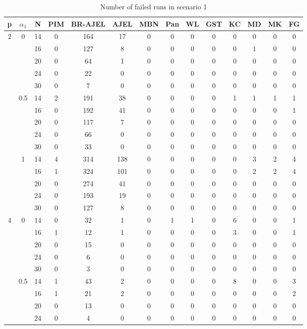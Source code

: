 \documentclass[num-refs]{wiley-article}
\begin{document}
\begin{table}[htbp!]
\scriptsize
\caption{Number of failed runs in scenario 1}
\centering
\begin{tabular}[t]{cccccccccccccc}
\hline
p & $\alpha_1$ & N & PIM & BR-AJEL & AJEL & MBN & Pan & WL & GST & KC & MD & MK & FG\\
\hline
2 & 0 & 14 & 0 & 164 & 17 & 0 & 0 & 0 & 0 & 0 & 0 & 0 & 0\\
& & 16 & 0 & 127 & 8 & 0 & 0 & 0 & 0 & 0 & 1 & 0 & 0\\
& & 20 & 0 & 64 & 1 & 0 & 0 & 0 & 0 & 0 & 0 & 0 & 0\\
& & 24 & 0 & 22 & 0 & 0 & 0 & 0 & 0 & 0 & 0 & 0 & 0\\
& & 30 & 0 & 7 & 0 & 0 & 0 & 0 & 0 & 0 & 0 & 0 & 0\\
\hline
 & 0.5 & 14 & 2 & 191 & 38 & 0 & 0 & 0 & 0 & 1 & 1 & 1 & 1\\
& & 16 & 0 & 192 & 41 & 0 & 0 & 0 & 0 & 0 & 0 & 0 & 1\\
& & 20 & 0 & 117 & 7 & 0 & 0 & 0 & 0 & 0 & 0 & 0 & 0\\
& & 24 & 0 & 66 & 0 & 0 & 0 & 0 & 0 & 0 & 0 & 0 & 0\\
&& 30 & 0 & 33 & 0 & 0 & 0 & 0 & 0 & 0 & 0 & 0 & 0\\
\hline
 & 1 & 14 & 4 & 314 & 138 & 0 & 0 & 0 & 0 & 0 & 3 & 2 & 4\\
& & 16 & 1 & 324 & 101 & 0 & 0 & 0 & 0 & 0 & 2 & 2 & 4\\
& & 20 & 0 & 274 & 41 & 0 & 0 & 0 & 0 & 0 & 0 & 0 & 0\\
& & 24 & 0 & 193 & 19 & 0 & 0 & 0 & 0 & 0 & 0 & 0 & 0\\
& & 30 & 0 & 127 & 8 & 0 & 0 & 0 & 0 & 0 & 0 & 0 & 0\\
\hline
4 & 0& 14 & 0 & 32 & 1 & 0 & 1 & 1 & 0 & 6 & 0 & 0 & 1\\
& & 16 & 1 & 12 & 1 & 0 & 0 & 0 & 0 & 3 & 0 & 0 & 1\\
& & 20 & 0 & 15 & 0 & 0 & 0 & 0 & 0 & 0 & 0 & 0 & 0\\
& & 24 & 0 & 6 & 0 & 0 & 0 & 0 & 0 & 0 & 0 & 0 & 0\\
& & 30 & 0 & 3 & 0 & 0 & 0 & 0 & 0 & 0 & 0 & 0 & 0\\
\hline
 & 0.5 & 14 & 1 & 43 & 2 & 0 & 0 & 0 & 0 & 8 & 0 & 0 & 3\\
& & 16 & 1 & 21 & 2 & 0 & 0 & 0 & 0 & 0 & 0 & 0 & 2\\
& & 20 & 0 & 13 & 0 & 0 & 0 & 0 & 0 & 0 & 0 & 0 & 0\\
& & 24 & 0 & 4 & 0 & 0 & 0 & 0 & 0 & 0 & 0 & 0 & 0\\

\end{tabular}
\end{table}
\end{document}
